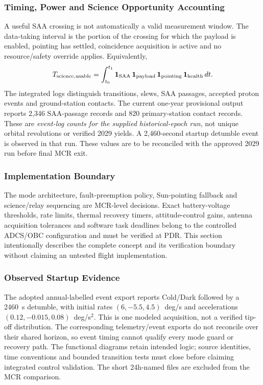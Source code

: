\subsubsection{Timing, Power and Science Opportunity Accounting}\label{app:op-logic-accounting}
A useful SAA crossing is not automatically a valid measurement window. The data-taking interval is the portion of the crossing for which the payload is enabled, pointing has settled, coincidence acquisition is active and no resource/safety override applies. Equivalently,
\begin{equation}
T_{\rm science,usable}=\int_{t_0}^{t_1}\mathbf{1}_{\rm SAA}\,\mathbf{1}_{\rm payload}\,\mathbf{1}_{\rm pointing}\,\mathbf{1}_{\rm health}\,dt.
\end{equation}
The integrated logs distinguish transitions, slews, SAA passages, accepted proton events and ground-station contacts. The current one-year provisional output reports 2,346 SAA-passage records and 820 primary-station contact records. These are \emph{event-log counts for the supplied historical-epoch run}, not unique orbital revolutions or verified 2029 yields. A 2,460-second startup detumble event is observed in that run. These values are to be reconciled with the approved 2029 run before final MCR exit.

\subsubsection{Implementation Boundary}\label{app:op-logic-note}
The mode architecture, fault-preemption policy, Sun-pointing fallback and science/relay sequencing are MCR-level decisions. Exact battery-voltage thresholds, rate limits, thermal recovery timers, attitude-control gains, antenna acquisition tolerances and software task deadlines belong to the controlled ADCS/OBC configuration and must be verified at PDR. This section intentionally describes the complete concept and its verification boundary without claiming an untested flight implementation.

\subsubsection{Observed Startup Evidence}\label{app:startup-evidence}
The adopted annual-labelled event export reports Cold/Dark followed by a 2460~s detumble, with initial rates $(6,-5.5,4.5)$~deg/s and accelerations $(0.12,-0.015,0.08)$~deg/s$^2$. This is one modeled acquisition, not a verified tip-off distribution. The corresponding telemetry/event exports do not reconcile over their shared horizon, so event timing cannot qualify every mode guard or recovery path. The functional diagrams retain intended logic; source identities, time conventions and bounded transition tests must close before claiming integrated control validation. The short 24h-named files are excluded from the MCR comparison.
